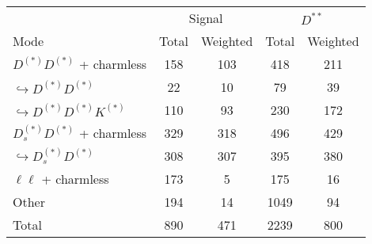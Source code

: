 \documentclass[6pt]{article}
\begin{document}
\begin{tabular}{l | cc | cc} \hline\hline
& \multicolumn{2}{c|}{Signal}&\multicolumn{2}{c}{$D^{**}$}\\
Mode & Total & Weighted & Total & Weighted \\ \hline
$D^{(*)} D^{(*)}$ + charmless & 158 & 103 & 418 & 211 \\
\;\;$\hookrightarrow D^{(*)} D^{(*)}$  & 22 & 10 & 79 & 39 \\
\;\;$\hookrightarrow D^{(*)} D^{(*)}K^{(*)}$  & 110 & 93 & 230 & 172 \\
$D^{(*)}_s D^{(*)}$ + charmless & 329 & 318 & 496 & 429 \\
\;\;$\hookrightarrow D^{(*)}_s D^{(*)}$  & 308 & 307 & 395 & 380 \\
$\ell\ell$ + charmless & 173 & 5 & 175 & 16 \\
Other & 194 & 14 & 1049 & 94 \\ \hline
Total & 890 & 471 & 2239 & 800 \\
\hline\hline \end{tabular}
\end{document}
